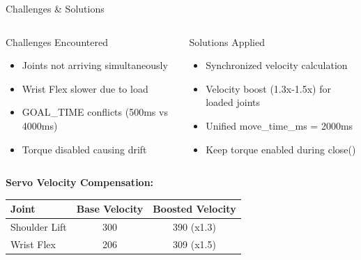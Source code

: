 \documentclass[aspectratio=169, 11pt]{beamer}
\begin{document}
\begin{frame}{Challenges \& Solutions}
    \begin{columns}[T]
        \begin{alertblock}{Challenges Encountered}
            \begin{itemize}
                \item Joints not arriving simultaneously
                \item Wrist Flex slower due to load
                \item GOAL\_TIME conflicts (500ms vs 4000ms)
                \item Torque disabled causing drift
            \end{itemize}
        \end{alertblock}
        
        \begin{exampleblock}{Solutions Applied}
            \begin{itemize}
                \item Synchronized velocity calculation
                \item Velocity boost (1.3x-1.5x) for loaded joints
                \item Unified move\_time\_ms = 2000ms
                \item Keep torque enabled during close()
            \end{itemize}
        \end{exampleblock}
    \end{columns}
    
    \vspace{3mm}
    \textbf{Servo Velocity Compensation:}
    \begin{table}
        \centering
        \small
        \begin{tabular}{lcc}
            \toprule
            Joint & Base Velocity & Boosted Velocity \\
            \midrule
            Shoulder Lift & 300 & 390 (x1.3) \\
            Wrist Flex & 206 & 309 (x1.5) \\
            \bottomrule
        \end{tabular}
    \end{table}
\end{frame}
\end{document}
